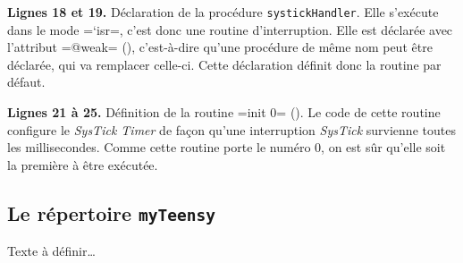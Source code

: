 {\bf Lignes 18 et 19.} Déclaration de la procédure \texttt{systickHandler}. Elle s'exécute dans le mode \plm=`isr=, c'est donc une routine d'interruption. Elle est déclarée avec l'attribut \plm=@weak= (), c'est-à-dire qu'une procédure de même nom peut être déclarée, qui va remplacer celle-ci. Cette déclaration définit donc la routine par défaut.

{\bf Lignes 21 à 25.} Définition de la routine \plm=init 0= (). Le code de cette routine configure le \emph{SysTick Timer} de façon qu'une interruption \emph{SysTick} survienne toutes les millisecondes. Comme cette routine porte le numéro $0$, on est sûr qu'elle soit la première à être exécutée.






\subsection{Le répertoire \texttt{myTeensy}}

Texte à définir…






